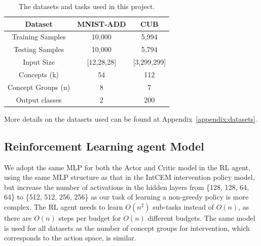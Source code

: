 \begin{table}
    \centering
    \renewcommand{\arraystretch}{1.5}
    \begin{tabular}{c|cc}

    Dataset & MNIST-ADD & CUB \\
    \hline
    Training Samples & 10,000 & 5,994 \\
    Testing Samples & 10,000 & 5,794 \\
    Input Size & [12,28,28] & [3,299,299]\\
    Concepts (k) & 54 & 112 \\
    Concept Groups (n) & 8 & 7 \\
    Output classes & 2 & 200
    \end{tabular}
    \caption{The datasets and tasks used in this project.}
    \label{table:datasets}
\end{table}

More details on the datasets used can be found at Appendix~\ref{appendix:datasets}.



\subsection{Reinforcement Learning agent Model}
We adopt the same MLP for 
both the Actor and Critic model in the RL agent, 
using the same MLP structure as that in the IntCEM intervention policy model,
but increase the number of activations in the hidden layers
 from \{128, 128, 64, 64\} to \{512, 512, 256, 256\} as
 our task of learning a non-greedy policy is more complex.
 The RL agent needs to learn 
 $O(n^2)$ sub-tasks instead of $O(n)$, as there are $O(n)$ 
steps per budget for $O(n)$ different budgets.
 The same model is used
 for all datasets as the number of concept groups for intervention,
 which corresponds to the action space,
 is similar. 
        
